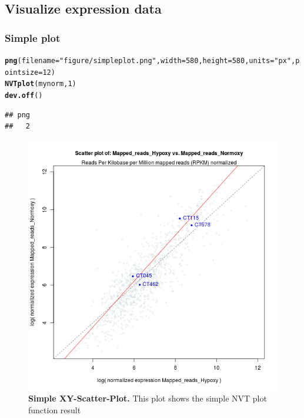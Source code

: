 \documentclass[11pt]{article}\usepackage[]{graphicx}\usepackage[]{color}
\makeatletter
\newcommand{\hlnum}[1]{\textcolor[rgb]{0.686,0.059,0.569}{#1}}%
\newcommand{\hlstr}[1]{\textcolor[rgb]{0.192,0.494,0.8}{#1}}%
\newcommand{\hlstd}[1]{\textcolor[rgb]{0.345,0.345,0.345}{#1}}%
\newcommand{\hlkwc}[1]{\textcolor[rgb]{0.333,0.667,0.333}{#1}}%
\newcommand{\hlkwd}[1]{\textcolor[rgb]{0.737,0.353,0.396}{\textbf{#1}}}%
\newenvironment{kframe}{%
 \def\at@end@of@kframe{}%
 \ifinner\ifhmode%
  \def\at@end@of@kframe{\end{minipage}}%
  \begin{minipage}{\columnwidth}%
 \fi\fi%
 \def\FrameCommand##1{\hskip\@totalleftmargin \hskip-\fboxsep
 \colorbox{shadecolor}{##1}\hskip-\fboxsep
     \hskip-\linewidth \hskip-\@totalleftmargin \hskip\columnwidth}%
 \MakeFramed {\advance\hsize-\width
   \@totalleftmargin\z@ \linewidth\hsize
   \@setminipage}}%
 {\par\unskip\endMakeFramed%
 \at@end@of@kframe}
\newenvironment{knitrout}{}{} %
\makeatother
\begin{document}
\subsection{Visualize expression data}

\subsubsection{Simple plot}

\begin{knitrout}
\color{fgcolor}\begin{kframe}
\begin{alltt}
\hlkwd{png}\hlstd{(}\hlkwc{filename} \hlstd{=} \hlstr{"figure/simpleplot.png"}\hlstd{,} \hlkwc{width} \hlstd{=} \hlnum{580}\hlstd{,} \hlkwc{height} \hlstd{=} \hlnum{580}\hlstd{,} \hlkwc{units} \hlstd{=} \hlstr{"px"}\hlstd{,} \hlkwc{pointsize} \hlstd{=} \hlnum{12}\hlstd{)}
\hlkwd{NVTplot}\hlstd{(mynorm,}\hlnum{1}\hlstd{)}
\hlkwd{dev.off}\hlstd{()}
\end{alltt}
\begin{verbatim}
## png 
##   2
\end{verbatim}
\end{kframe}
\end{knitrout}

\begin{figure}
\centering
\includegraphics[width=.8\textwidth]{figure/simpleplot}
\caption{
  \textbf{Simple XY-Scatter-Plot.}
  This plot shows the simple NVT plot function result}
\label{fig:MA}
\end{figure}
\end{document}

